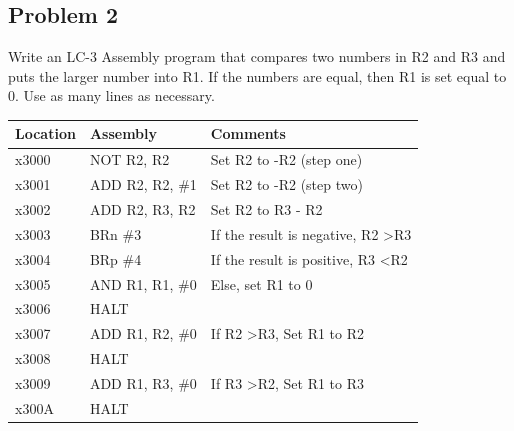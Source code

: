 \documentclass{article}
\begin{document}
\newpage
\subsection*{Problem 2}
Write an LC-3 Assembly program that compares two numbers in R2 and R3 and puts the larger number into R1. If the numbers are equal, then R1 is set equal  to 0. Use as many lines as necessary.

\begin{table}[!h]
\begin{tabular}{|l|l|l|}
\hline
\textbf{Location} & \textbf{Assembly} & \textbf{Comments}                             \\ \hline
x3000             & NOT R2, R2        & Set R2 to -R2 (step one)                      \\ \hline
x3001             & ADD R2, R2, \#1   & Set R2 to -R2 (step two)                      \\ \hline
x3002             & ADD R2, R3, R2    & Set R2 to R3 - R2                             \\ \hline
x3003             & BRn \#3           & If the result is negative, R2 \textgreater R3 \\ \hline
x3004             & BRp \#4           & If the result is positive, R3 \textless R2    \\ \hline
x3005             & AND R1, R1, \#0   & Else, set R1 to 0                             \\ \hline
x3006             & HALT              &                                               \\ \hline
x3007             & ADD R1, R2, \#0   & If R2 \textgreater R3, Set R1 to R2           \\ \hline
x3008             & HALT              &                                               \\ \hline
x3009             & ADD R1, R3, \#0   & If R3 \textgreater R2, Set R1 to R3           \\ \hline
x300A             & HALT              &                                               \\ \hline
\end{tabular}
\end{table}

\newpage
\end{document}
